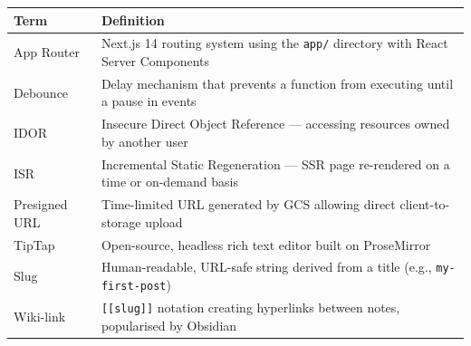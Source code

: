 \documentclass[12pt, a4paper]{article}
\begin{document}
\begin{longtable}{@{}L{3.2cm} L{10cm}@{}}
  \toprule
  \textbf{Term} & \textbf{Definition} \\
  \midrule\endhead
  \bottomrule\endfoot
  App Router    & Next.js 14 routing system using the \texttt{app/} directory
                  with React Server Components \\
  Debounce      & Delay mechanism that prevents a function from executing until
                  a pause in events \\
  IDOR          & Insecure Direct Object Reference — accessing resources owned
                  by another user \\
  ISR           & Incremental Static Regeneration — SSR page re-rendered on a
                  time or on-demand basis \\
  Presigned URL & Time-limited URL generated by GCS allowing direct
                  client-to-storage upload \\
  TipTap        & Open-source, headless rich text editor built on ProseMirror \\
  Slug          & Human-readable, URL-safe string derived from a title
                  (e.g., \texttt{my-first-post}) \\
  Wiki-link     & \texttt{[[slug]]} notation creating hyperlinks between notes,
                  popularised by Obsidian \\
\end{longtable}
\end{document}
